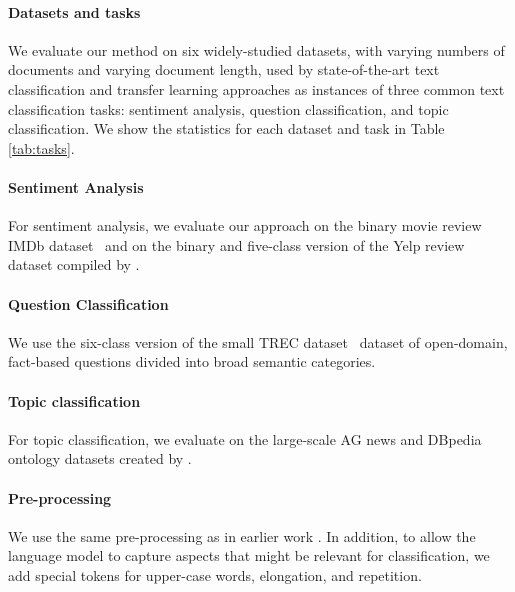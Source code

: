 \documentclass[11pt,a4paper]{article}
\begin{document}
\paragraph{Datasets and tasks} We evaluate our method on six widely-studied datasets, with varying numbers of documents and varying document length, used by state-of-the-art text classification and transfer learning approaches \cite{johnson2017deep,Mccann2017} as instances of three common text classification tasks: sentiment analysis, question classification, and topic classification. We show the statistics for each dataset and task in Table \ref{tab:tasks}.

\paragraph{Sentiment Analysis} For sentiment analysis, we evaluate our approach on the binary movie review IMDb dataset~\cite{maas2011learning} and on the binary and five-class version of the Yelp review dataset compiled by .

\paragraph{Question Classification} We use the six-class version of the small TREC dataset~\cite{voorhees1999trec} dataset of open-domain, fact-based questions divided into broad semantic categories.

\paragraph{Topic classification} For topic classification, we evaluate on the large-scale AG news and DBpedia ontology datasets created by .

\paragraph{Pre-processing} We use the same pre-processing as in earlier work \cite{johnson2017deep,Mccann2017}. In addition, to allow the language model to capture aspects that might be relevant for classification, we add special tokens for upper-case words, elongation, and repetition.
\end{document}
